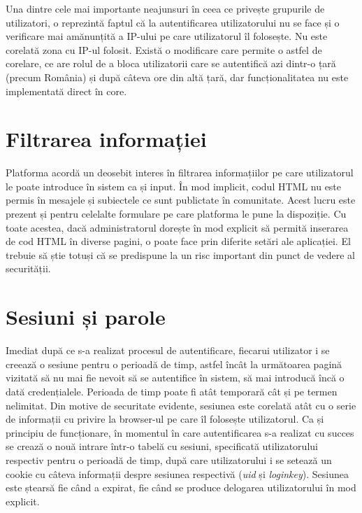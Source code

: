 Una dintre cele mai importante neajunsuri în ceea ce privește grupurile de utilizatori, o reprezintă faptul că la autentificarea utilizatorului nu se face și o verificare mai amănunțită a IP-ului pe care utilizatorul îl folosește. Nu este corelată zona cu IP-ul folosit. Există o modificare care permite o astfel de corelare, ce are rolul de a bloca utilizatorii care se autentifică azi dintr-o țară (precum România) și după câteva ore din altă țară, dar funcționalitatea nu este implementată direct în core.

\section{Filtrarea informației}

Platforma acordă un deosebit interes în filtrarea informațiilor pe care utilizatorul le poate introduce în sistem ca și input. În mod implicit, codul HTML nu este permis în mesajele și subiectele ce sunt publictate în comunitate. Acest lucru este prezent și pentru celelalte formulare pe care platforma le pune la dispoziție. Cu toate acestea, dacă administratorul dorește în mod explicit să permită inserarea de cod HTML în diverse pagini, o poate face prin diferite setări ale aplicației. El trebuie să știe totuși că se predispune la un risc important din punct de vedere al securității.

\section{Sesiuni și parole}

Imediat după ce s-a realizat procesul de autentificare, fiecarui utilizator i se creează o sesiune pentru o perioadă de timp, astfel încât la următoarea pagină vizitată să nu mai fie nevoit să se autentifice în sistem, să mai introducă încă o dată credențialele. Perioada de timp poate fi atât temporară cât și pe termen nelimitat. Din motive de securitate evidente, sesiunea este corelată atât cu o serie de informații cu privire la browser-ul pe care îl folosește utilizatorul. Ca și principiu de funcționare, în momentul în care autentificarea s-a realizat cu succes se crează o nouă intrare într-o tabelă cu sesiuni, specificată utilizatorului respectiv pentru o perioadă de timp, după care utilizatorului i se setează un cookie cu câteva informații despre sesiunea respectivă (\textit{uid} și \textit{loginkey}). Sesiunea este ștearsă fie când a expirat, fie când se produce delogarea utilizatorului în mod explicit.

